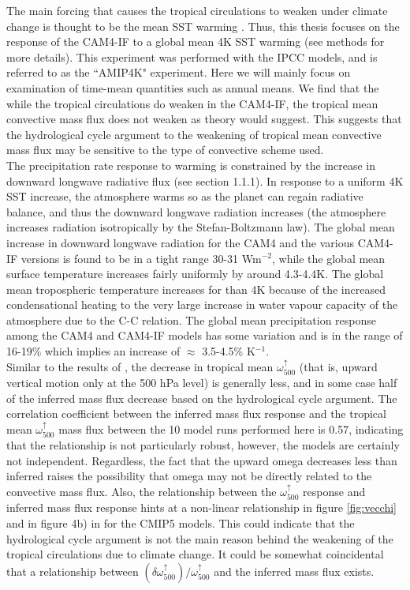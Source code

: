 \documentclass[letterpaper,12pt,titlepage,oneside,final]{book}
\begin{document}
The main forcing that causes the tropical circulations to weaken under climate change is thought to be the mean SST warming \citep{he_anthropogenic_2015}. Thus, this thesis focuses on the response of the CAM4-IF to a global mean 4K SST warming (see methods for more details). This experiment was performed with the IPCC models, and is referred to as the ``AMIP4K" experiment. Here we will mainly focus on examination of time-mean quantities such as annual means. We find that the while the tropical circulations do weaken in the CAM4-IF, the tropical mean convective mass flux does not weaken as theory would suggest. This suggests that the hydrological cycle argument to the weakening of tropical mean convective mass flux may be sensitive to the type of convective scheme used.
\\
The precipitation rate response to warming is constrained by the increase in downward longwave radiative flux (see section 1.1.1). In response to a uniform 4K SST increase, the atmosphere warms so as the planet can regain radiative balance, and thus the downward longwave radiation increases (the atmosphere increases radiation isotropically by the Stefan-Boltzmann law). The global mean increase in downward longwave radiation for the CAM4 and the various CAM4-IF versions is found to be in a tight range 30-31 Wm$^{-2}$, while the global mean surface temperature increases fairly uniformly by around 4.3-4.4K. The global mean tropospheric temperature increases for than 4K because of the increased condensational heating to the very large increase in water vapour capacity of the atmosphere due to the C-C relation. The global mean precipitation response among the CAM4 and CAM4-IF models has some variation and is in the range of 16-19\% which implies an increase of $\approx$ 3.5-4.5\% K$^{-1}$.
\\
Similar to the results of \citep{vecchi_global_2007}, the decrease in tropical mean $\omega_{500}^{\uparrow}$ (that is, upward vertical motion only at the 500 hPa level) is generally less, and in some case half of the inferred mass flux decrease based on the hydrological cycle argument. The correlation coefficient between the inferred mass flux response and the tropical mean $\omega_{500}^{\uparrow}$ mass flux between the 10 model runs performed here is 0.57, indicating that the relationship is not particularly robust, however, the models are certainly not independent. Regardless, the fact that the upward omega decreases less than inferred raises the possibility that omega may not be directly related to the convective mass flux. Also, the relationship between the $\omega_{500}^{\uparrow}$ response and inferred mass flux response hints at a non-linear relationship in figure \ref{fig:vecchi} and in figure 4b) in \citep{vecchi_global_2007} for the CMIP5 models. This could indicate that the hydrological cycle argument is not the main reason behind the weakening of the tropical circulations due to climate change. It could be somewhat coincidental that a relationship between $(\delta{\omega_{500}^{\uparrow}})/\omega_{500}^{\uparrow}$ and the inferred mass flux exists.
\end{document}

